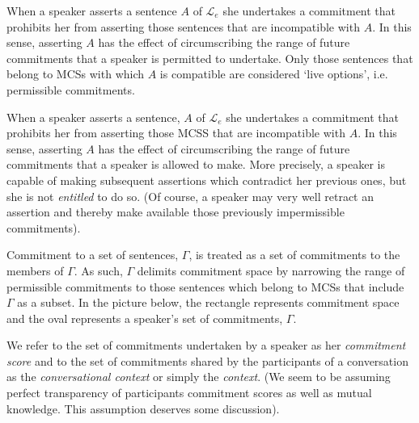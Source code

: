 \documentclass{article}                     %
\theoremstyle{definition}
\begin{document}
When a speaker asserts a sentence $ A $ of $ \mathcal{L}_e $ she undertakes a commitment that prohibits her from asserting those sentences that are incompatible with $ A $. In this sense, asserting $ A $ has the effect of circumscribing the range of future commitments that a speaker is permitted to undertake. Only those sentences that belong to MCSs with which $A$ is compatible are considered `live options', i.e. permissible commitments.

When a speaker asserts a sentence, $ A $ of $ \mathcal{L}_e $ she undertakes a commitment that prohibits her from asserting those MCSS that are incompatible with $ A $. In this sense, asserting $ A $ has the effect of circumscribing the range of future commitments that a speaker is allowed to make. More precisely, a speaker is capable of making subsequent assertions which contradict her previous ones, but she is not \textit{entitled} to do so. (Of course, a speaker may very well retract an assertion and thereby make available those previously impermissible commitments).

Commitment to a set of sentences, $ \Gamma $, is treated as a set of commitments to the members of $ \Gamma $. As such, $ \Gamma $ delimits commitment space by narrowing the range of permissible commitments to those sentences which belong to MCSs that include $ \Gamma $ as a subset. In the picture below, the rectangle represents commitment space and the oval represents a speaker's set of commitments, $ \Gamma $. 

\begin{center}
	


\end{center}

We refer to the set of commitments undertaken by a speaker as her \textit{commitment score} and to the set of commitments shared by the participants of a conversation as the \textit{conversational context} or simply the \textit{context}. (We seem to be assuming perfect transparency of participants commitment scores as well as mutual knowledge. This assumption deserves some discussion).
\end{document}
